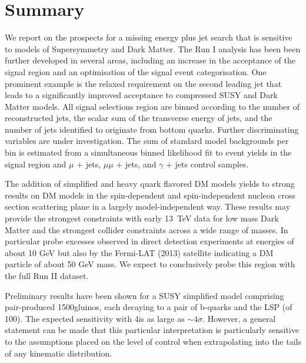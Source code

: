 \section{Summary}
\label{sec:summary}

We report on the prospects for a missing energy plus jet search that
is sensitive to models of Supersymmetry and Dark Matter. 
The Run I analysis has been been further developed in several areas,
including an increase in the acceptance of the signal region and an
optimisation of the signal event categorisation. One prominent example
is the relaxed requirement on the second leading jet that leads to a
significantly improved acceptance to compressed SUSY and Dark Matter
models.
All signal selections region are binned according to the number of
reconstructed jets, the scalar sum of the transverse energy of jets,
and the number of jets identified to originate from bottom
quarks. Further discriminating variables are under investigation. The
sum of standard model backgrounds per bin is estimated from a
simultaneous binned likelihood fit to event yields in the signal
region and $\mu$ + jets, $\mu\mu$ + jets, and $\gamma$ + jets control
samples.

The addition of simplified and heavy quark flavored DM models yields
to strong results on DM models in the spin-dependent and
spin-independent nucleon cross section scattering plane in a largely
model-independent way. These results may provide the strongest
constraints with early 13~TeV data for low mass Dark Matter and the
strongest collider constraints across a wide range of masses. In
particular probe excesses observed in direct detection experiments at
energies of about 10 GeV but also by the Fermi-LAT (2013) satellite
indicating a DM particle of about 50 GeV mass. We expect to
conclusively probe this region with the full Run II dataset.

Preliminary results have been shown for a SUSY simplified model
comprising pair-produced 1500\gev gluinos, each decaying to a pair of
b-quarks and the LSP (of 100\gev). The expected sensitivity with
4\fbinv is as large as $\sim4\sigma$. However, a general statement can
be made that this particular interpretation is particularly sensitive
to the assumptions placed on the level of control when extrapolating
into the tails of any kinematic distribution.

